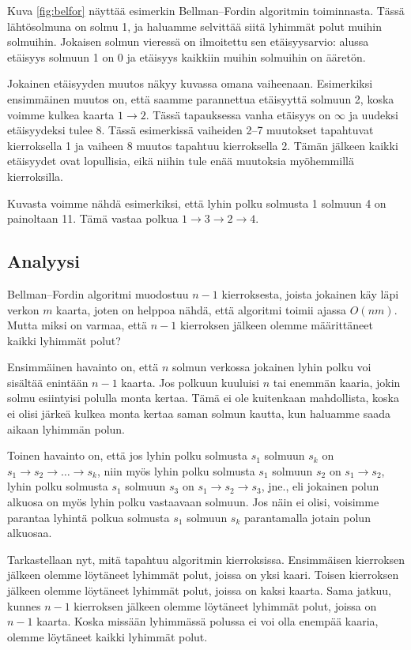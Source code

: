 Kuva \ref{fig:belfor} näyttää esimerkin Bellman–Fordin algoritmin toiminnasta.
Tässä lähtösolmuna on solmu 1, ja haluamme selvittää siitä
lyhimmät polut muihin solmuihin.
Jokaisen solmun vieressä on ilmoitettu sen etäisyysarvio:
alussa etäisyys solmuun 1 on 0 ja etäisyys kaikkiin muihin solmuihin on ääretön.

Jokainen etäisyyden muutos näkyy kuvassa omana vaiheenaan.
Esimerkiksi ensimmäinen muutos on,
että saamme parannettua etäisyyttä solmuun 2,
koska voimme kulkea kaarta $1 \rightarrow 2$.
Tässä tapauksessa vanha etäisyys on $\infty$ ja uudeksi
etäisyydeksi tulee $8$.
Tässä esimerkissä vaiheiden 2--7 muutokset tapahtuvat
kierroksella 1 ja vaiheen 8 muutos tapahtuu kierroksella 2.
Tämän jälkeen kaikki etäisyydet ovat lopullisia,
eikä niihin tule enää muutoksia myöhemmillä kierroksilla.

Kuvasta voimme nähdä esimerkiksi,
että lyhin polku solmusta 1 solmuun 4 on painoltaan 11.
Tämä vastaa polkua $1 \rightarrow 3 \rightarrow 2 \rightarrow 4$.

\subsection{Analyysi}

Bellman–Fordin algoritmi muodostuu $n-1$ kierroksesta,
joista jokainen käy läpi verkon $m$ kaarta,
joten on helppoa nähdä, että algoritmi toimii ajassa $O(nm)$.
Mutta miksi on varmaa, että $n-1$ kierroksen jälkeen olemme
määrittäneet kaikki lyhimmät polut?

Ensimmäinen havainto on,
että $n$ solmun verkossa jokainen lyhin polku voi
sisältää enintään $n-1$ kaarta.
Jos polkuun kuuluisi $n$ tai enemmän kaaria,
jokin solmu esiintyisi polulla monta kertaa.
Tämä ei ole kuitenkaan mahdollista,
koska ei olisi järkeä kulkea monta kertaa saman solmun kautta,
kun haluamme saada aikaan lyhimmän polun.

Toinen havainto on, että jos lyhin polku solmusta $s_1$ solmuun $s_k$ on
$s_1 \rightarrow s_2 \rightarrow \dots \rightarrow s_k$,
niin myös lyhin polku solmusta $s_1$ solmuun $s_2$ on $s_1 \rightarrow s_2$,
lyhin polku solmusta $s_1$ solmuun $s_3$ on $s_1 \rightarrow s_2 \rightarrow s_3$, jne.,
eli jokainen polun alkuosa on myös lyhin polku vastaavaan solmuun.
Jos näin ei olisi, voisimme parantaa lyhintä polkua solmusta $s_1$ solmuun $s_k$
parantamalla jotain polun alkuosaa.

Tarkastellaan nyt, mitä tapahtuu algoritmin kierroksissa.
Ensimmäisen kierroksen jälkeen olemme löytäneet lyhimmät polut,
joissa on yksi kaari.
Toisen kierroksen jälkeen olemme löytäneet lyhimmät polut,
joissa on kaksi kaarta.
Sama jatkuu, kunnes $n-1$ kierroksen jälkeen olemme löytäneet
lyhimmät polut, joissa on $n-1$ kaarta.
Koska missään lyhimmässä polussa ei voi olla enempää kaaria,
olemme löytäneet kaikki lyhimmät polut.

